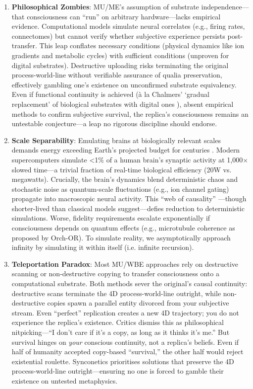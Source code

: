 \documentclass[10pt]{article}
\begin{document}
\begin{sloppypar}
  \newpage

  \begin{enumerate}
    \item \textbf{Philosophical Zombies}: MU/ME’s assumption of substrate independence—that consciousness can “run” on arbitrary hardware—lacks empirical evidence. Computational models simulate neural correlates (e.g., firing rates, connectomes) but cannot verify whether subjective experience persists post-transfer. This leap conflates necessary conditions (physical dynamics like ion gradients and metabolic cycles) with sufficient conditions (unproven for digital substrates). Destructive uploading risks terminating the original process-world-line without verifiable assurance of qualia preservation, effectively gambling one’s existence on unconfirmed substrate equivalency. Even if functional continuity is achieved (à la Chalmers’ ‘gradual replacement’ of biological substrates with digital ones \citep{chalmers_conscious_1998}), absent empirical methods to confirm subjective survival, the replica’s consciousness remains an untestable conjecture—a leap no rigorous discipline should endorse.

    \item \textbf{Scale Separability}: Emulating brains at biologically relevant scales demands energy exceeding Earth’s projected budget for centuries \citep{bostrom_whole_2008}. Modern supercomputers simulate <1\% of a human brain’s synaptic activity at 1,000\(\times\) slowed time—a trivial fraction of real-time biological efficiency (20W vs. megawatts). Crucially, the brain’s dynamics blend deterministic chaos and stochastic noise as quantum-scale fluctuations (e.g., ion channel gating) propagate into macroscopic neural activity. This “web of causality” \citep{watanabe_biological_2022}—though shorter-lived than classical models suggest—defies reduction to deterministic simulations. Worse, fidelity requirements escalate exponentially if consciousness depends on quantum effects (e.g., microtubule coherence as proposed by Orch-OR). To simulate reality, we asymptotically approach infinity by simulating it within itself (i.e. infinite recursion).

    \item \textbf{Teleportation Paradox}: Most MU/WBE approaches rely on destructive scanning or non-destructive copying to transfer consciousness onto a computational substrate. Both methods sever the original’s causal continuity: destructive scans terminate the 4D process-world-line outright, while non-destructive copies spawn a parallel entity divorced from your subjective stream. Even “perfect” replication creates a new 4D trajectory; you do not experience the replica’s existence. Critics dismiss this as philosophical nitpicking—“I don’t care if it’s a copy, as long as it thinks it’s me.” But survival hinges on \emph{your} conscious continuity, not a replica’s beliefs. Even if half of humanity accepted copy-based “survival,” the other half would reject existential roulette. Synconetics prioritises solutions that preserve the 4D process-world-line outright—ensuring no one is forced to gamble their existence on untested metaphysics.
  \end{enumerate}


\end{sloppypar}
\end{document}
